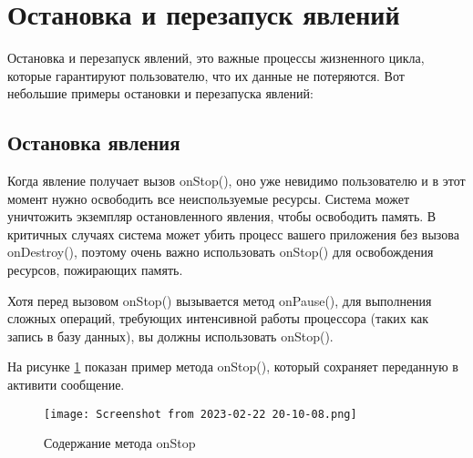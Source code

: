 \section{Остановка и перезапуск явлений}
Остановка и перезапуск явлений, это важные процессы жизненного цикла,
которые гарантируют пользователю, что их данные не потеряются. Вот
небольшие примеры остановки и перезапуска явлений:

\subsection{Остановка явления}
Когда явление получает вызов onStop(), оно уже невидимо пользователю и
в этот момент нужно освободить все неиспользуемые ресурсы. Система может
уничтожить экземпляр остановленного явления, чтобы освободить память. В
критичных случаях система может убить процесс вашего приложения без
вызова onDestroy(), поэтому очень важно использовать onStop() для
освобождения ресурсов, пожирающих память.\par
Хотя перед вызовом onStop() вызывается метод onPause(), для выполнения
сложных операций, требующих интенсивной работы процессора (таких как
запись в базу данных), вы должны использовать onStop().\par
На рисунке \ref{fig:activity:onStop:content} показан пример метода onStop(),
который сохраняет переданную в активити сообщение.
\begin{figure}[h!tp]
	\centering
	\texttt{[image: Screenshot from 2023-02-22 20-10-08.png]}
	\caption{Содержание метода onStop}
	\label{fig:activity:onStop:content}
\end{figure}

